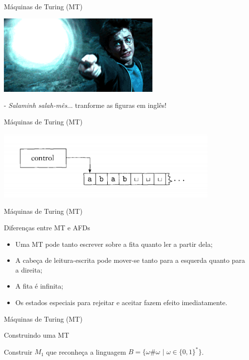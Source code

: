 \documentclass[xcolor=dvipsnames,table]{beamer}
\begin{document}
	\begin{frame}{Máquinas de Turing (MT)}
		\begin{center}
			\includegraphics[height=4cm]{images/harry.png}
			
			- {\it Salaminh salah-mês}... tranforme as figuras em inglês!
		\end{center}
	\end{frame}	
	
	\begin{frame}{Máquinas de Turing (MT)}
		\begin{center}
			\includegraphics[height=3.5cm]{images/fig31.png}
		\end{center}
	\end{frame}
	
	\begin{frame}{Máquinas de Turing (MT)}
		\begin{block}{Diferenças entre MT e AFDs}
			\begin{itemize}
				\item Uma MT pode tanto escrever sobre a fita quanto ler a partir dela;
				\item A cabeça de leitura-escrita pode mover-se tanto para a esquerda quanto para a direita;
				\item A fita é infinita;
				\item Os estados especiais para rejeitar e aceitar fazem efeito imediatamente.
			\end{itemize}
		\end{block}
	\end{frame}
	
	\begin{frame}{Máquinas de Turing (MT)}
		\begin{block}{Construindo uma MT}
			\begin{center}
			Construir $M_1$ que reconheça a linguagem $B = \{ \omega \# \omega \mbox{ | } \omega \in \{ 0, 1 \}^* \}$.
			\end{center}
		\end{block}
	\end{frame}
	
\end{document}

